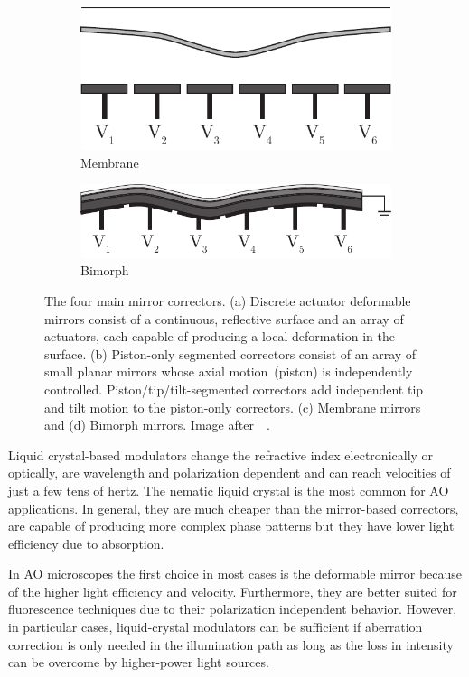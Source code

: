 \begin{figure}[tbh]
			\begin{subfigure}[b]{0.25\textwidth}
							\includegraphics[width=\textwidth]{images/deformable_membrane}
							\caption{Membrane}
							\label{fig:Correctors_membrane}
			\end{subfigure}
			\quad
			\begin{subfigure}[b]{0.25\textwidth}
							\includegraphics[width=\textwidth]{images/deformable_bimorph}
							\caption{Bimorph}
							\label{fig:Correctors_bimorph}
			\end{subfigure}							
			\caption{The four main mirror correctors. (a) Discrete actuator deformable mirrors consist of a continuous, reflective surface and an array of actuators, each capable of producing a local deformation in the surface. (b) Piston-only segmented correctors consist of an array of small planar mirrors whose axial motion~(piston) is independently controlled. Piston/tip/tilt-segmented correctors add independent tip and tilt motion to the piston-only correctors. (c) Membrane mirrors and (d) Bimorph mirrors. Image after~~\cite{AO_vision_science}.}
	\label{fig:Correctors}
\end{figure} 


Liquid crystal-based modulators change the refractive index electronically or optically, are wavelength and polarization dependent and can reach velocities of just a few tens of hertz. The nematic liquid crystal is the most common for AO applications. In general, they are much cheaper than the mirror-based correctors, are capable of producing more complex phase patterns but they have lower light efficiency due to absorption.   

In AO microscopes the first choice in most cases is the deformable mirror because of the higher light efficiency and velocity. Furthermore, they are better suited for fluorescence techniques due to their polarization independent behavior. However, in particular cases, liquid-crystal modulators can be sufficient if aberration correction is only needed in the illumination path as long as the loss in intensity can be overcome by higher-power light sources. 
